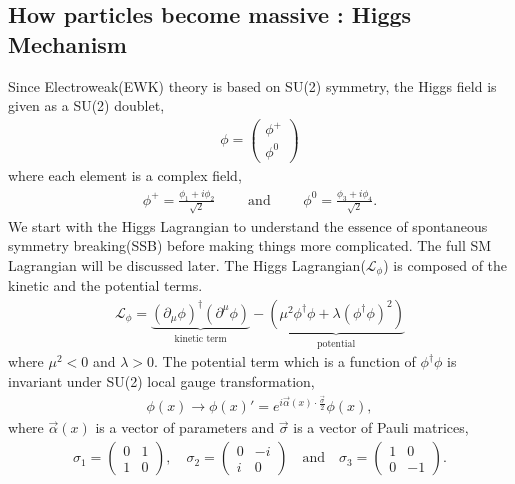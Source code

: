 \subsection{How particles become massive : Higgs Mechanism}
Since Electroweak(EWK) theory is based on SU(2) symmetry, the Higgs field is 
given as a SU(2) doublet, 
\begin{eqnarray} 
\phi = \left(  \begin{array}{c} \phi^+ \\ \phi^0 \end{array} \right)
\end{eqnarray} 
where each element is a complex field, 
\begin{eqnarray} 
\phi^+ = \frac{\phi_1 + i\phi_2}{\sqrt{2}} 
\qquad \textrm{ and } \qquad  
\phi^0 = \frac{\phi_3 + i\phi_4}{\sqrt{2}}.
\end{eqnarray} 
We start with the Higgs Lagrangian to understand the essence of 
spontaneous symmetry breaking(SSB) before making things more 
complicated. The full SM Lagrangian will be discussed later.  
The Higgs Lagrangian($\mathcal{L}_\phi$) is composed of the kinetic 
and the potential terms. 
\begin{eqnarray}
\label{eq:lagHiggs}
\mathcal{L}_\phi 
=
\underbrace{
    \left( \partial_\mu \phi \right)^\dagger \left( \partial^\mu \phi \right)
}_\text{kinetic term} 
- 
\underbrace{
    \left( \mu^2 \phi^\dagger \phi + \lambda \left( \phi^\dagger \phi \right)^2 \right)
}_\text{potential} 
\end{eqnarray} 
where $\mu^2<0$ and $\lambda>0$.
The potential term which is a function of $ \phi^\dagger \phi$ is invariant under 
SU(2) local gauge transformation, 
\begin{eqnarray} 
\phi(x) 
\rightarrow 
\phi(x)' = e^{i \vec{\alpha}(x) \cdot \frac{\vec{\sigma}}{2}} \phi(x),
\end{eqnarray} 
where $\vec{\alpha}(x)$ is a vector of parameters and  
$\vec{\sigma}$ is a vector of Pauli matrices,  
\begin{align*}
\sigma_1 = \begin{pmatrix} 0 & 1\\
                            1 & 0
            \end{pmatrix}, 
\quad 
\sigma_2 = \begin{pmatrix} 0 & -i\\
                            i & 0
            \end{pmatrix}
\quad 
\textrm{and} 
\quad 
\sigma_3 = \begin{pmatrix} 1 & 0\\
                            0 & -1
            \end{pmatrix}.
\end{align*}
